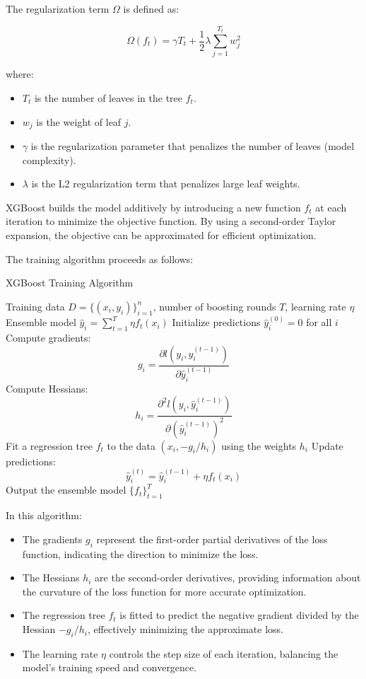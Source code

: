 \documentclass[12pt]{article}
\begin{document}
The regularization term \( \Omega \) is defined as:

\[
\Omega\left(f_t\right) = \gamma T_t + \frac{1}{2} \lambda \sum_{j=1}^{T_t} w_j^2
\]

where:

\begin{itemize}
    \item \( T_t \) is the number of leaves in the tree \( f_t \).
    \item \( w_j \) is the weight of leaf \( j \).
    \item \( \gamma \) is the regularization parameter that penalizes the number of leaves (model complexity).
    \item \( \lambda \) is the L2 regularization term that penalizes large leaf weights.
\end{itemize}

XGBoost builds the model additively by introducing a new function \( f_t \) at each iteration to minimize the objective function. By using a second-order Taylor expansion, the objective can be approximated for efficient optimization.

The training algorithm proceeds as follows:

\begin{algorithm}
\caption{XGBoost Training Algorithm}
\begin{algorithmic}[1]
\REQUIRE Training data \( D = \{(x_i, y_i)\}_{i=1}^{n} \), number of boosting rounds \( T \), learning rate \( \eta \)
\ENSURE Ensemble model \( \hat{y}_i = \sum_{t=1}^{T} \eta f_t(x_i) \)
\STATE Initialize predictions \( \hat{y}_i^{(0)} = 0 \) for all \( i \)
    \STATE Compute gradients:
    \[
    g_i = \frac{\partial l\left(y_i, \hat{y}_i^{(t-1)}\right)}{\partial \hat{y}_i^{(t-1)}}
    \]
    \STATE Compute Hessians:
    \[
    h_i = \frac{\partial^2 l\left(y_i, \hat{y}_i^{(t-1)}\right)}{\partial \left(\hat{y}_i^{(t-1)}\right)^2}
    \]
    \STATE Fit a regression tree \( f_t \) to the data \((x_i, -g_i/h_i)\) using the weights \( h_i \)
    \STATE Update predictions:
    \[
    \hat{y}_i^{(t)} = \hat{y}_i^{(t-1)} + \eta f_t(x_i)
    \]
\ENDFOR
\STATE Output the ensemble model \( \{f_t\}_{t=1}^{T} \)
\end{algorithmic}
\end{algorithm}

In this algorithm:

\begin{itemize}
    \item The gradients \( g_i \) represent the first-order partial derivatives of the loss function, indicating the direction to minimize the loss.
    \item The Hessians \( h_i \) are the second-order derivatives, providing information about the curvature of the loss function for more accurate optimization.
    \item The regression tree \( f_t \) is fitted to predict the negative gradient divided by the Hessian \(-g_i/h_i\), effectively minimizing the approximate loss.
    \item The learning rate \( \eta \) controls the step size of each iteration, balancing the model's training speed and convergence.
\end{itemize}
\end{document}
